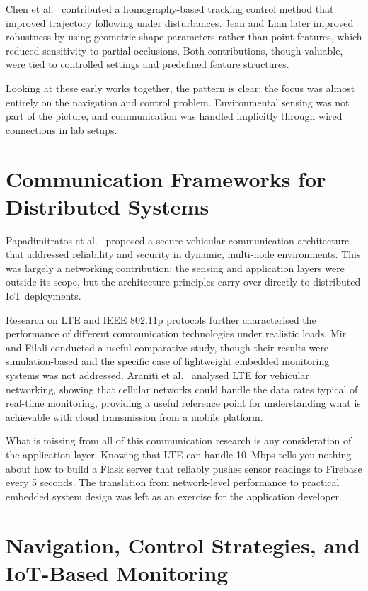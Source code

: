 Chen et al.\ \cite{r8} contributed a homography-based tracking control
method that improved trajectory following under disturbances. Jean and
Lian \cite{r14} later improved robustness by using geometric shape
parameters rather than point features, which reduced sensitivity to
partial occlusions. Both contributions, though valuable, were tied to
controlled settings and predefined feature structures.

Looking at these early works together, the pattern is clear: the focus
was almost entirely on the navigation and control problem. Environmental
sensing was not part of the picture, and communication was handled
implicitly through wired connections in lab setups.

\section{Communication Frameworks for Distributed Systems}

Papadimitratos et al.\ \cite{r3} proposed a secure vehicular
communication architecture that addressed reliability and security in
dynamic, multi-node environments. This was largely a networking
contribution; the sensing and application layers were outside its
scope, but the architecture principles carry over directly to
distributed IoT deployments.

Research on LTE and IEEE 802.11p protocols \cite{r4,r16} further
characterised the performance of different communication technologies
under realistic loads. Mir and Filali \cite{r16} conducted a useful
comparative study, though their results were simulation-based and the
specific case of lightweight embedded monitoring systems was not
addressed. Araniti et al.\ \cite{r4} analysed LTE for vehicular
networking, showing that cellular networks could handle the data
rates typical of real-time monitoring, providing a useful reference point for
understanding what is achievable with cloud transmission from a mobile
platform.

What is missing from all of this communication research is any
consideration of the application layer. Knowing that LTE can handle
10~Mbps tells you nothing about how to build a Flask server that
reliably pushes sensor readings to Firebase every 5 seconds. The
translation from network-level performance to practical embedded
system design was left as an exercise for the application developer.

\section{Navigation, Control Strategies, and IoT-Based Monitoring}

